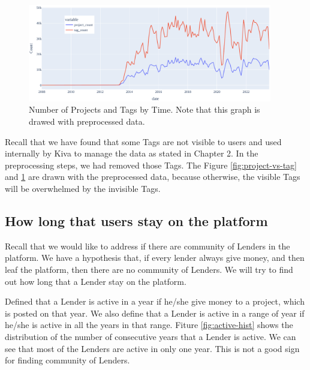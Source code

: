 \begin{figure}[H]
	\centering
	\includegraphics[width=0.95\textwidth]{images/tag-project-vs-time.pdf}
	\caption[Number of Projects and Tags by Time]{
		Number of Projects and Tags by Time.
		Note that this graph is drawed with preprocessed data.
	}
	\label{fig:tag-project-vs-time}
\end{figure}

Recall that we have found that some Tags are not visible to users and used internally by Kiva to manage the data as stated in Chapter 2.
In the preprocessing steps, we had removed those Tags.
The Figure \ref{fig:project-vs-tag} and \ref{fig:tag-project-vs-time}
are drawn with the preprocessed data,
because otherwise, the visible Tags will be overwhelmed by the invisible Tags.





\subsection{How long that users stay on the platform}

Recall that we would like to address if there are community of Lenders in the platform.
We have a hypothesis that, if every lender always give money, and then leaf the platform,
then there are no community of Lenders.
We will try to find out how long that a Lender stay on the platform.

Defined that a Lender is active in a year if he/she give money to a project, which is posted on that year.
We also define that a Lender is active in a range of year if he/she is active in all the years in that range.
Fiture \ref{fig:active-hist} shows the distribution of the number of consecutive years that a Lender is active.
We can see that most of the Lenders are active in only one year.
This is not a good sign for finding community of Lenders.



